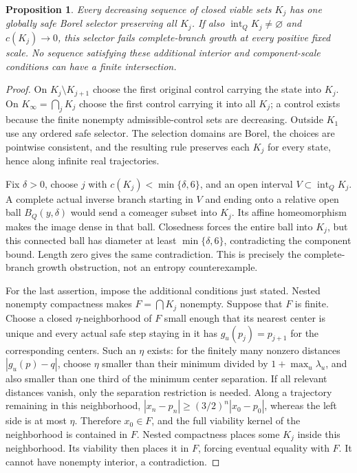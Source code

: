 \documentclass[11pt,reqno]{amsart}
\numberwithin{equation}{section}
\newtheorem{proposition}[theorem]{Proposition}
\theoremstyle{definition}
\newcommand{\intr}{\operatorname{int}}
\begin{document}
\begin{proposition}\label{prop:nested-selector}
Every decreasing sequence of closed viable sets $K_j$ has one
globally safe Borel selector preserving all $K_j$. If also
$\intr_QK_j\ne\varnothing$ and $c(K_j)\to0$, this selector
fails complete-branch growth at every positive fixed scale.
No sequence satisfying these additional interior and component-scale
conditions can have a finite intersection.
\end{proposition}
\begin{proof}
On $K_j\setminus K_{j+1}$ choose the first original control
carrying the state into $K_j$. On $K_\infty=\bigcap_jK_j$
choose the first control carrying it into all $K_j$; a control
exists because the finite nonempty admissible-control sets are
decreasing. Outside $K_1$ use any ordered safe selector.
The selection domains are Borel, the choices are pointwise
consistent, and the resulting rule preserves each $K_j$ for
every state, hence along infinite real trajectories.

Fix $\delta>0$, choose $j$ with
$c(K_j)<\min\{\delta,6\}$, and an open interval
$V\subset\intr_QK_j$. A complete actual inverse branch starting
in $V$ and ending onto a relative open ball $B_Q(y,\delta)$
would send a comeager subset into $K_j$. Its affine homeomorphism
makes the image dense in that ball. Closedness forces the entire
ball into $K_j$, but this connected ball has diameter at least
$\min\{\delta,6\}$, contradicting the component bound.
Length zero gives the same contradiction. This is precisely the
complete-branch growth obstruction, not an entropy counterexample.

For the last assertion, impose the additional conditions just stated.
Nested nonempty compactness makes $F=\bigcap K_j$ nonempty.
Suppose that $F$ is finite. Choose
a closed $\eta$-neighborhood of $F$ small enough that its
nearest center is unique and every actual safe step staying in it
has $g_u(p_j)=p_{j+1}$ for the corresponding centers. Such an
$\eta$ exists: for the finitely many nonzero distances
$|g_u(p)-q|$, choose $\eta$ smaller than their minimum divided
by $1+\max_u\lambda_u$, and also smaller than one third of
the minimum center separation. If all relevant distances vanish,
only the separation restriction is needed. Along a trajectory
remaining in this neighborhood,
$|x_{n}-p_n|\ge(3/2)^n|x_0-p_0|$, whereas the left side is
at most $\eta$. Therefore $x_0\in F$, and the full viability
kernel of the neighborhood is contained in $F$. Nested compactness
places some $K_j$ inside this neighborhood. Its viability then
places it in $F$, forcing eventual equality with $F$. It cannot
have nonempty interior, a contradiction.
\end{proof}
\end{document}
